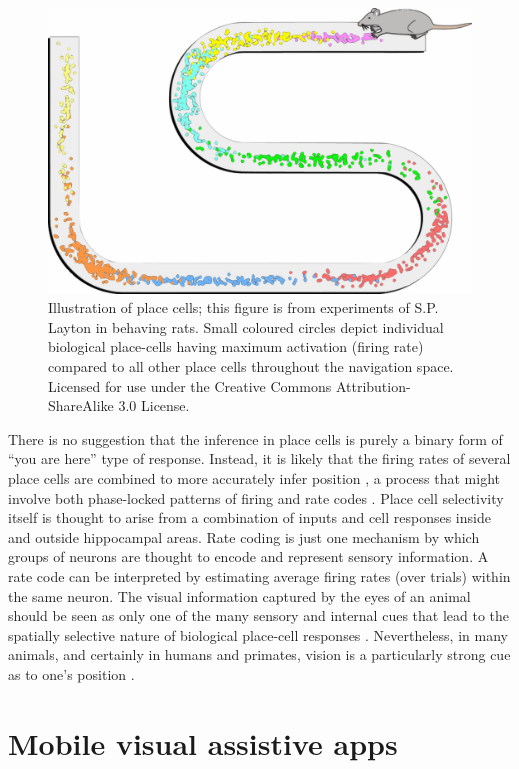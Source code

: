 \begin{figure}[!t]
\centering
\includegraphics[width=.6\linewidth]{./gfx/Chapter01/bio_place_cells_rat.pdf}
\caption{Illustration of place cells; this figure is from experiments of S.P. Layton in behaving rats. Small coloured circles depict individual biological place-cells having maximum activation (firing rate) compared to all other place cells throughout the navigation space. Licensed for use under the Creative Commons Attribution-ShareAlike 3.0 License.}
\label{fig:Maze}
\end{figure}

There is no suggestion that the inference in place cells is purely a binary form of ``you are here'' type of response.  Instead, it is likely that the firing rates of several place cells are combined to more accurately infer position \cite{hafting2005microstructure}, a process that might involve both phase-locked patterns of firing and rate codes \cite{dragoi2006temporal}. Place cell selectivity itself is thought to arise from a combination of inputs and cell responses inside and outside hippocampal areas. Rate coding \cite{van2001rate} is just one mechanism by which groups of neurons are thought to encode and represent sensory information. A rate code can be interpreted by estimating average firing rates (over trials) within the same neuron. %
The visual information captured by the eyes of an animal should be seen as only one of the many sensory and internal cues that lead to the spatially selective nature of biological place-cell responses \cite{hassabis2009decoding}. Nevertheless, in many animals, and certainly in humans and primates, vision is a particularly strong cue as to one's position \cite{epstein1998cortical}.


\section{Mobile visual assistive apps}

